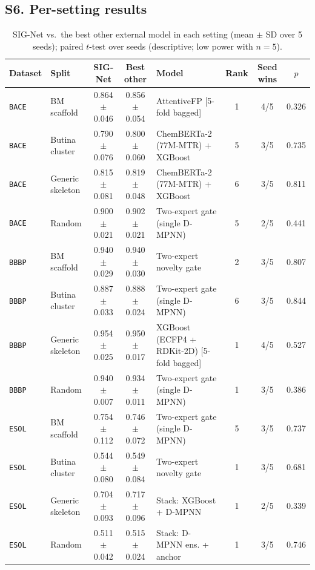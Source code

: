\documentclass[11pt]{article}
\begin{document}
\begin{landscape}
\section*{S6. Per-setting results}
{\small
\begin{longtable}{llcclccc}
\caption{SIG-Net vs.\ the best other external model in each setting (mean $\pm$ SD over 5 seeds); paired $t$-test over seeds (descriptive; low power with $n=5$).}\\
\toprule
Dataset & Split & SIG-Net & Best other & Model & Rank & Seed wins & $p$ \\
\midrule
\texttt{BACE} & BM scaffold & 0.864 $\pm$ 0.046 & 0.856 $\pm$ 0.054 & AttentiveFP [5-fold bagged] & 1 & 4/5 & 0.326 \\
\texttt{BACE} & Butina cluster & 0.790 $\pm$ 0.076 & 0.800 $\pm$ 0.060 & ChemBERTa-2 (77M-MTR) + XGBoost & 5 & 3/5 & 0.735 \\
\texttt{BACE} & Generic skeleton & 0.815 $\pm$ 0.081 & 0.819 $\pm$ 0.048 & ChemBERTa-2 (77M-MTR) + XGBoost & 6 & 3/5 & 0.811 \\
\texttt{BACE} & Random & 0.900 $\pm$ 0.021 & 0.902 $\pm$ 0.021 & Two-expert gate (single D-MPNN) & 5 & 2/5 & 0.441 \\
\texttt{BBBP} & BM scaffold & 0.940 $\pm$ 0.029 & 0.940 $\pm$ 0.030 & Two-expert novelty gate & 2 & 3/5 & 0.807 \\
\texttt{BBBP} & Butina cluster & 0.887 $\pm$ 0.033 & 0.888 $\pm$ 0.024 & Two-expert gate (single D-MPNN) & 6 & 3/5 & 0.844 \\
\texttt{BBBP} & Generic skeleton & 0.954 $\pm$ 0.025 & 0.950 $\pm$ 0.017 & XGBoost (ECFP4 + RDKit-2D) [5-fold bagged] & 1 & 4/5 & 0.527 \\
\texttt{BBBP} & Random & 0.940 $\pm$ 0.007 & 0.934 $\pm$ 0.011 & Two-expert gate (single D-MPNN) & 1 & 3/5 & 0.386 \\
\texttt{ESOL} & BM scaffold & 0.754 $\pm$ 0.112 & 0.746 $\pm$ 0.072 & Two-expert gate (single D-MPNN) & 5 & 3/5 & 0.737 \\
\texttt{ESOL} & Butina cluster & 0.544 $\pm$ 0.080 & 0.549 $\pm$ 0.084 & Two-expert novelty gate & 1 & 3/5 & 0.681 \\
\texttt{ESOL} & Generic skeleton & 0.704 $\pm$ 0.093 & 0.717 $\pm$ 0.096 & Stack: XGBoost + D-MPNN & 1 & 2/5 & 0.339 \\
\texttt{ESOL} & Random & 0.511 $\pm$ 0.042 & 0.515 $\pm$ 0.024 & Stack: D-MPNN ens. + anchor & 1 & 3/5 & 0.746 \\

\end{longtable}}
\end{landscape}
\end{document}
